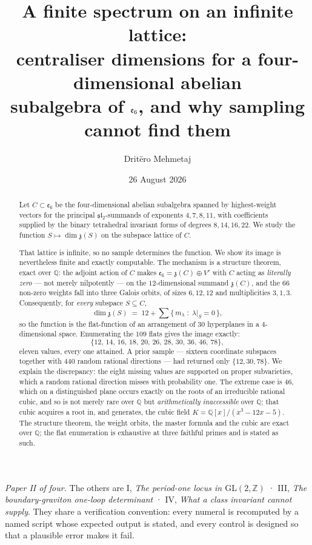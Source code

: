 \documentclass[11pt,a4paper]{article}
\title{A finite spectrum on an infinite lattice:\\
centraliser dimensions for a four-dimensional abelian\\
subalgebra of $\esix$, and why sampling cannot find them}
\author{Drit\"ero Mehmetaj}
\date{26 August 2026}
\theoremstyle{definition}
\theoremstyle{remark}
\newcommand{\esix}{\mathfrak{e}_6}
\newcommand{\slt}{\mathfrak{sl}_2}
\newcommand{\z}{\mathfrak{z}}
\newcommand{\Q}{\mathbb{Q}}
\begin{document}
\maketitle

\begin{abstract}
Let $C\subset\esix$ be the four-dimensional abelian subalgebra spanned by highest-weight
vectors for the principal $\slt$-summands of exponents $4,7,8,11$, with coefficients supplied
by the binary tetrahedral invariant forms of degrees $8,14,16,22$. We study the function
$S\mapsto\dim\z(S)$ on the subspace lattice of $C$.

That lattice is infinite, so no sample determines the function. We show its image is
nevertheless finite and exactly computable. The mechanism is a structure theorem, exact over
$\Q$: the adjoint action of $C$ makes $\esix=\z(C)\oplus V'$ with $C$ acting as \emph{literally
zero} --- not merely nilpotently --- on the $12$-dimensional summand $\z(C)$, and the $66$
non-zero weights fall into three Galois orbits, of sizes $6,12,12$ and multiplicities $3,1,3$.
Consequently, for \emph{every} subspace $S\subseteq C$,
\[
   \dim\z(S)\;=\;12+\sum\bigl\{\,m_\lambda \;:\; \lambda|_S=0\,\bigr\},
\]
so the function is the flat-function of an arrangement of $30$ hyperplanes in a $4$-dimensional
space. Enumerating the $109$ flats gives the image exactly:
\[
   \{12,\,14,\,16,\,18,\,20,\,26,\,28,\,30,\,36,\,46,\,78\},
\]
eleven values, every one attained. A prior sample --- sixteen coordinate subspaces together
with $440$ random rational directions --- had returned only $\{12,30,78\}$. We explain the
discrepancy: the eight missing values are supported on proper subvarieties, which a random
rational direction misses with probability one. The extreme case is $46$, which on a
distinguished plane occurs exactly on the roots of an irreducible rational cubic, and so is not
merely rare over $\Q$ but \emph{arithmetically inaccessible} over $\Q$; that cubic acquires a
root in, and generates, the cubic field $K=\Q[x]/(x^3-12x-5)$. The structure theorem, the
weight orbits, the master formula and the cubic are exact over $\Q$; the flat enumeration is
exhaustive at three faithful primes and is stated as such.
\end{abstract}

\begin{center}\small
\textit{Paper II of four.} The others are I, \emph{The period-one locus in $\mathrm{GL}(2,\mathbb{Z})$} · III, \emph{The boundary-graviton one-loop determinant} · IV, \emph{What a class invariant cannot supply}.
They share a verification convention: every numeral is recomputed by a named script whose
expected output is stated, and every control is designed so that a plausible error makes it fail.
\end{center}
\end{document}
